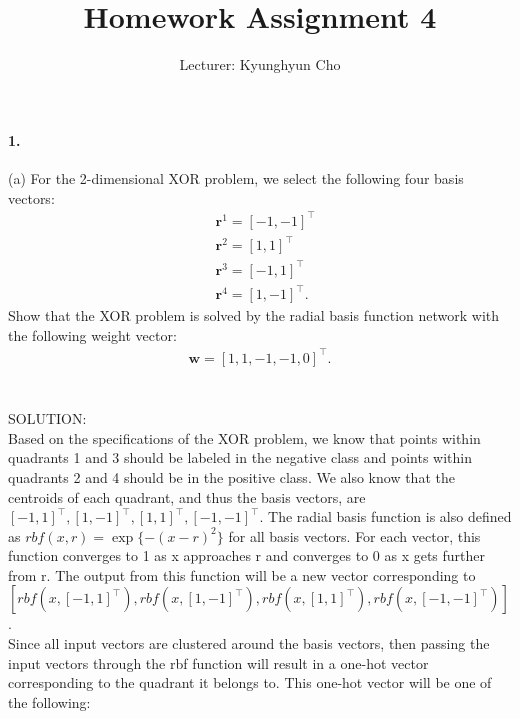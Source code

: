 \documentclass{article}
\newcommand{\vect}[1]{\mathbf{#1}}
\newcommand{\vw}[0]{\vect{w}}
\newcommand{\vr}[0]{\vect{r}}
\begin{document}
\title{Homework Assignment 4}
\author{Lecturer: Kyunghyun Cho}

\maketitle
{}

\paragraph{1.} 

(a) For the 2-dimensional XOR problem, we select the following four basis
vectors:
\begin{align*}
    &\vr^1 = [-1, -1]^\top \\
    &\vr^2 = [1, 1]^\top \\
    &\vr^3 = [-1, 1]^\top \\
    &\vr^4 = [1, -1]^\top.
\end{align*}
Show that the XOR problem is solved by the radial basis function network with
the following weight vector:
\begin{align*}
    \vw = \left[ 1, 1, -1, -1, 0 \right]^\top.
\end{align*}
\\
\\
SOLUTION: \\
Based on the specifications of the XOR problem, we know that points within quadrants 1 and 3 should be labeled in the negative class and points within quadrants 2 and 4 should be in the positive class. We also know that the centroids of each quadrant, and thus the basis vectors, are $[-1, 1]^\top, [1, -1]^\top, [1, 1]^\top, [-1, -1]^\top$. The radial basis function is also defined as $rbf(x, r) = \exp\{-(x - r)^2\}$ for all basis vectors. For each vector, this function converges to 1 as x approaches r and converges to 0 as x gets further from r. The output from this function will be a new vector corresponding to $[rbf(x, [-1, 1]^\top), rbf(x, [1, -1]^\top), rbf(x, [1, 1]^\top), rbf(x, [-1, -1]^\top)]$. \\
Since all input vectors are clustered around the basis vectors, then passing the input vectors through the rbf function will result in a one-hot vector corresponding to the quadrant it belongs to. This one-hot vector will be one of the following: \\
\end{document}
